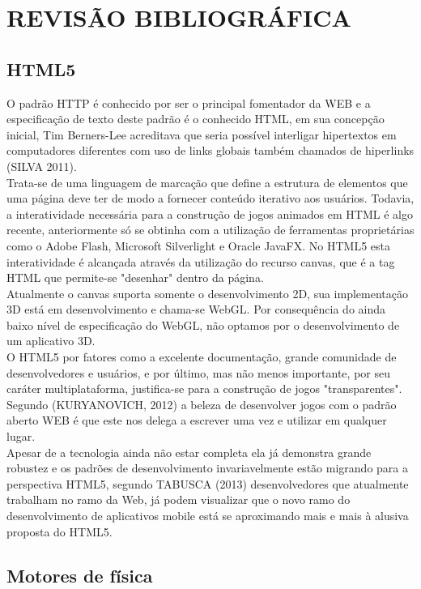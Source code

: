 \documentclass{article}
\begin{document}
\section{REVISÃO BIBLIOGRÁFICA}
\subsection{HTML5}
O padrão HTTP é conhecido por ser o principal fomentador da WEB e a especificação de texto deste padrão é o conhecido HTML, em sua concepção inicial, Tim Berners-Lee acreditava que seria possível  interligar hipertextos em computadores diferentes com uso de links globais também chamados de hiperlinks (SILVA 2011).
\\
	Trata-se de uma linguagem de marcação que define a estrutura de elementos que uma página deve ter de modo a fornecer conteúdo iterativo aos usuários. Todavia, a interatividade necessária para a construção de jogos animados em HTML é algo recente, anteriormente só se obtinha com a utilização de ferramentas proprietárias como o Adobe Flash, Microsoft Silverlight e Oracle JavaFX. No HTML5 esta interatividade é alcançada através da utilização do recurso canvas, que é a tag HTML que permite-se "desenhar" dentro da página.
\\
	Atualmente o canvas suporta somente o desenvolvimento 2D, sua implementação 3D está em desenvolvimento e chama-se WebGL. Por consequência do ainda baixo nível de especificação do WebGL, não optamos por o desenvolvimento de um aplicativo 3D.
\\
	O HTML5 por fatores como a excelente documentação, grande comunidade de desenvolvedores e usuários, e por último, mas não menos importante, por seu caráter multiplataforma, justifica-se para a construção de jogos "transparentes". Segundo (KURYANOVICH, 2012) a beleza de desenvolver jogos com o padrão aberto WEB é que este nos delega a escrever uma vez e utilizar em qualquer lugar.
\\

Apesar de a tecnologia  ainda não estar completa ela já demonstra grande robustez  e os padrões de desenvolvimento invariavelmente estão migrando para a perspectiva HTML5, segundo TABUSCA (2013) desenvolvedores que atualmente trabalham no ramo da Web, já podem visualizar que o novo ramo do desenvolvimento de aplicativos mobile está se aproximando mais e mais à alusiva proposta do HTML5. \subsection{Motores de física}
\\
\end{document}
